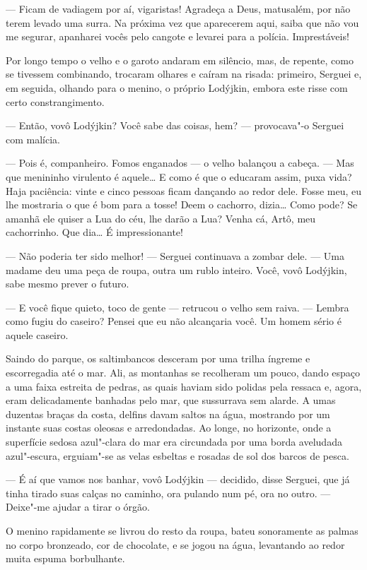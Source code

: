 --- Ficam de vadiagem por aí, vigaristas! Agradeça a Deus, matusalém,
por não terem levado uma surra. Na próxima vez que aparecerem aqui,
saiba que não vou me segurar, apanharei vocês pelo cangote e levarei para a
polícia. Imprestáveis!

Por longo tempo o velho e o garoto andaram em silêncio, mas, de
repente, como se tivessem combinando, trocaram olhares e caíram na
risada: primeiro, Serguei e, em seguida, olhando para o menino, o
próprio Lodýjkin, embora este risse com certo constrangimento.

--- Então, vovô Lodýjkin? Você sabe das coisas, hem? --- provocava"-o
Serguei com malícia.

--- Pois é, companheiro. Fomos enganados --- o velho balançou a cabeça.
--- Mas que menininho virulento é aquele\ldots{} E como é que o educaram
assim, puxa vida? Haja paciência: vinte e cinco pessoas ficam dançando
ao redor dele. Fosse meu, eu lhe mostraria o que é bom para a tosse!
Deem o cachorro, dizia\ldots{} Como pode? Se amanhã ele quiser a Lua do céu,
lhe darão a Lua? Venha cá, Artô, meu cachorrinho. Que dia\ldots{} É
impressionante!

--- Não poderia ter sido melhor! --- Serguei continuava a zombar dele.
--- Uma madame deu uma peça de roupa, outra um rublo inteiro. Você, vovô
Lodýjkin, sabe mesmo prever o futuro.

--- E você fique quieto, toco de gente --- retrucou o velho sem raiva.
--- Lembra como fugiu do caseiro? Pensei que eu não alcançaria você. Um
homem sério é aquele caseiro.

Saindo do parque, os saltimbancos desceram por uma trilha íngreme e
escorregadia até o mar. Ali, as montanhas se recolheram um pouco, dando
espaço a uma faixa estreita de pedras, as quais haviam sido polidas pela
ressaca e, agora, eram delicadamente banhadas pelo mar, que sussurrava
sem alarde. A umas duzentas braças da costa, delfins davam saltos na
água, mostrando por um instante suas costas oleosas e arredondadas. Ao
longe, no horizonte, onde a superfície sedosa azul"-clara do mar era
circundada por uma borda aveludada azul"-escura, erguiam"-se as velas
esbeltas e rosadas de sol dos barcos de pesca.

--- É aí que vamos nos banhar, vovô Lodýjkin --- decidido, disse
Serguei, que já tinha tirado suas calças no caminho, ora pulando num pé,
ora no outro. --- Deixe"-me ajudar a tirar o órgão.

O menino rapidamente se livrou do resto da roupa, bateu sonoramente as
palmas no corpo bronzeado, cor de chocolate, e se jogou na água,
levantando ao redor muita espuma borbulhante.

